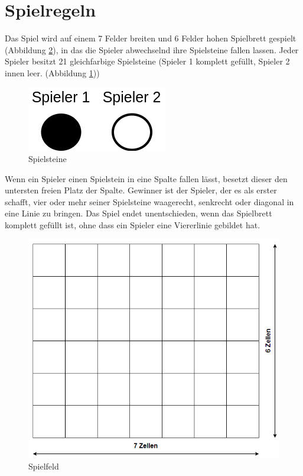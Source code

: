 \section{Spielregeln}
    Das Spiel wird auf einem 7 Felder breiten und 6 Felder hohen Spielbrett gespielt (Abbildung \ref{fig:spielfeld}),
    in das die Spieler abwechselnd ihre Spielsteine fallen lassen. Jeder Spieler besitzt 21 gleichfarbige Spielsteine (Spieler 1 komplett gefüllt, Spieler 2 innen leer. (Abbildung \ref{fig:spieler}))
    \begin{figure}[H]
        \centering
        \includegraphics[scale=0.5]{img/spieler.png}    
        \caption{Spielsteine}
        \label{fig:spieler}
    \end{figure}
    Wenn ein Spieler einen Spielstein in eine Spalte fallen lässt, besetzt dieser den untersten freien Platz der Spalte.
    Gewinner ist der Spieler, der es als erster schafft, vier oder mehr seiner Spielsteine waagerecht, senkrecht oder diagonal in eine Linie zu bringen.
    Das Spiel endet unentschieden, wenn das Spielbrett komplett gefüllt ist, ohne dass ein Spieler eine Viererlinie gebildet hat.
    \begin{figure}[H]
        \centering
        \includegraphics[scale=0.5]{img/spielfeld.png}    
        \caption{Spielfeld}
        \label{fig:spielfeld}
    \end{figure}